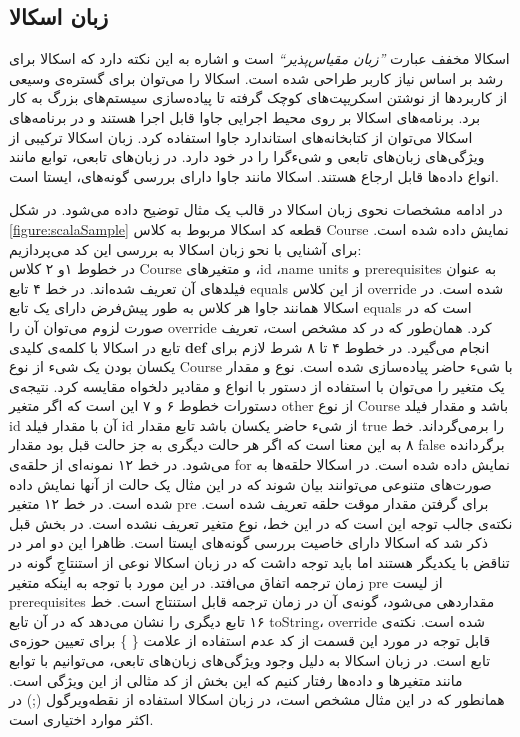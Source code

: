 \subsection{زبان اسکالا}
اسکالا مخفف عبارت \emph{''زبان مقیاس‌پذیر``} است و اشاره به این نکته دارد که اسکالا برای رشد بر اساس نیاز کاربر طراحی شده است. اسکالا را می‌توان برای گستره‌ی وسیعی از کاربردها از نوشتن اسکریپت‌های کوچک گرفته تا پیاده‌سازی سیستم‌های بزرگ به کار برد. برنامه‌های اسکالا بر روی محیط اجرایی جاوا  قابل اجرا هستند و در برنامه‌های اسکالا  می‌توان از کتابخانه‌های استاندارد جاوا استفاده کرد.
زبان اسکالا ترکیبی از ویژگی‌های زبان‌های \gls{تابعی} و شیءگرا را در خود دارد. در زبان‌های تابعی، توابع مانند انواع داده‌ها قابل ارجاع هستند. اسکالا مانند جاوا دارای \gls{بررسی گونه‌ها}ی، \gls{ایستا} است.

در ادامه مشخصات نحوی زبان اسکالا در قالب یک مثال توضیح داده می‌شود. در شکل \ref{figure:scalaSample} قطعه کد اسکالا مربوط به کلاس Course نمایش داده شده است. برای آشنایی با نحو زبان اسکالا به بررسی این کد می‌پردازیم:\\
در خطوط ۱و ۲ کلاس Course و متغیرهای ،id ،name units و prerequisites به عنوان فیلد‌های آن تعریف شده‌اند. در خط ۴ تابع equals از این کلاس override شده است. در اسکالا همانند جاوا هر کلاس به طور پیش‌فرض دارای یک تابع‌ equals است که در صورت لزوم می‌توان آن را override کرد. همان‌طور که در کد مشخص است، تعریف تابع در اسکالا با کلمه‌ی کلیدی  \textbf{def} انجام می‌گیرد. در خطوط ۴ تا ۸ شرط لازم برای یکسان بودن یک شیء از نوع Course با شیء حاضر پیاده‌سازی شده است. نوع و مقدار یک متغیر را می‌توان با استفاده از دستور  با انواع و مقادیر دلخواه مقایسه کرد. نتیجه‌ی دستورات خطوط ۶ و ۷ این است که اگر متغیر other از نوع Course باشد و مقدار فیلد id آن با مقدار فیلد id از شیء حاضر یکسان باشد تابع مقدار true را برمی‌گرداند. خط ۸ به این معنا است که اگر هر حالت دیگری به جز حالت قبل بود مقدار false برگردانده ‌می‌شود. در خط ۱۲ ‌نمونه‌ای از حلقه‌ی for نمایش داده شده است. در اسکالا حلقه‌ها به صورت‌های متنوعی می‌توانند بیان شوند که در این مثال یک حالت از آنها نمایش داده شده است.  در خط ۱۲ متغیر pre برای گرفتن مقدار موقت حلقه تعریف شده است. نکته‌ی جالب توجه این است که در این خط، نوع متغیر تعریف نشده است. در بخش قبل ذکر شد که اسکالا دارای خاصیت بررسی گونه‌های ایستا  است. ظاهرا این دو امر در تناقض با یکدیگر هستند اما باید توجه داشت که در زبان اسکالا نوعی از استنتاجِ گونه در زمان ترجمه اتفاق می‌افتد. در این مورد با توجه به اینکه متغیر pre از لیست prerequisites مقداردهی می‌شود، گونه‌ی آن در زمان ترجمه قابل استنتاج است. خط ۱۶ تابع دیگری را نشان می‌دهد که در آن تابع toString، override شده است. نکته‌ی قابل توجه در مورد این قسمت از کد عدم استفاده از علامت \{ \} برای تعیین حوزه‌ی تابع است. در زبان اسکالا به دلیل وجود ویژگی‌های زبان‌های تابعی، می‌توانیم با توابع مانند متغیر‌ها و داده‌ها رفتار کنیم که این بخش از کد مثالی از این ویژگی است. همانطور که در این مثال مشخص است، در زبان اسکالا استفاده از نقطه‌ویرگول (;) در اکثر موارد اختیاری است.

